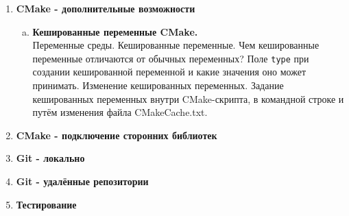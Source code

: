 \documentclass{article}
\begin{document}
\begin{enumerate}
\begin{enumerate}[a.]
\end{enumerate}






\item \textbf{CMake - дополнительные возможности}

\begin{enumerate}[a.]
\item \textbf{Кешированные переменные CMake.}\\
Переменные среды. Кешированные переменные. Чем кешированные переменные отличаются от обычных переменных? Поле \texttt{type} при создании кешированной переменной и какие значения оно может принимать. Изменение кешированных переменных. Задание кешированных переменных внутри CMake-скрипта, в командной строке и путём изменения файла CMakeCache.txt.\\
\end{enumerate}

\item \textbf{CMake - подключение сторонних библиотек}





\item \textbf{Git - локально}





\item \textbf{Git - удалённые репозитории}





\item \textbf{Тестирование}





\end{enumerate}
\end{document}
